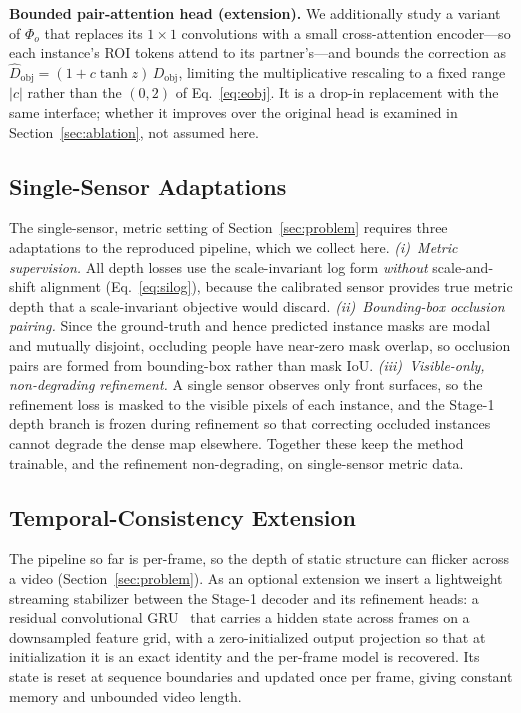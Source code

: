 \documentclass[sigconf, review=true]{acmart}
\begin{document}
\smallskip\noindent\textbf{Bounded pair-attention head (extension).}
We additionally study a variant of $\Phi_o$ that replaces its $1{\times}1$
convolutions with a small cross-attention encoder---so each instance's ROI
tokens attend to its partner's---and bounds the correction as
$\hat D_{\mathrm{obj}}=(1+c\tanh z)\,D_{\mathrm{obj}}$, limiting the
multiplicative rescaling to a fixed range $|c|$ rather than the
$(0,2)$ of Eq.~\eqref{eq:eobj}. It is a drop-in replacement with the same
interface; whether it improves over the original head is examined in
Section~\ref{sec:ablation}, not assumed here.

\subsection{Single-Sensor Adaptations}
\label{ssec:adapt}
The single-sensor, metric setting of Section~\ref{sec:problem} requires three
adaptations to the reproduced pipeline, which we collect here.
\emph{(i)~Metric supervision.} All depth losses use the scale-invariant log form
\emph{without} scale-and-shift alignment (Eq.~\eqref{eq:silog}), because the
calibrated sensor provides true metric depth that a scale-invariant objective
would discard. \emph{(ii)~Bounding-box occlusion pairing.} Since the ground-truth
and hence predicted instance masks are modal and mutually disjoint, occluding
people have near-zero mask overlap, so occlusion pairs are formed from
bounding-box rather than mask IoU. \emph{(iii)~Visible-only, non-degrading
refinement.} A single sensor observes only front surfaces, so the refinement
loss is masked to the visible pixels of each instance, and the Stage-1 depth
branch is frozen during refinement so that correcting occluded instances cannot
degrade the dense map elsewhere. Together these keep the method trainable, and
the refinement non-degrading, on single-sensor metric data.

\subsection{Temporal-Consistency Extension}
\label{ssec:temporal}
The pipeline so far is per-frame, so the depth of static structure can flicker
across a video (Section~\ref{sec:problem}). As an optional extension we insert a
lightweight streaming stabilizer between the Stage-1 decoder and its refinement
heads: a residual convolutional GRU~\cite{ballas2016convgru} that carries a
hidden state across frames on a downsampled feature grid, with a zero-initialized
output projection so that at initialization it is an exact identity and the
per-frame model is recovered. Its state is reset at sequence boundaries and
updated once per frame, giving constant memory and unbounded video length.
\end{document}
